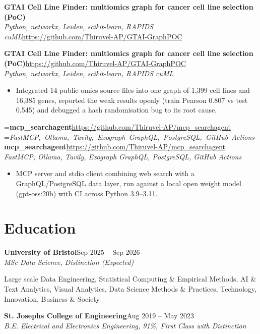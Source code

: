 \documentclass[a4paper,11pt]{article}
\newcommand{\roleNoLoc}[3]{\textbf{#1}\hfill{\color{muted}#2}\\ \textit{#3}\par}
\newcommand{\project}[3]{%
  \textbf{#1}\hfill#3\\ {\color{muted}\small\textit{#2}}\par}
\newcommand{\gap}{\vspace{5pt}}
\begin{document}
\else
\textbf{GTAI Cell Line Finder: multiomics graph for cancer cell line selection (PoC)}\\ {\color{muted}\small\textit{Python, networkx, Leiden, scikit-learn, RAPIDS cuML}}\hfill{\small\url{https://github.com/Thiruvel-AP/GTAI-GraphPOC}}\par
\fi
\else
\project{GTAI Cell Line Finder: multiomics graph for cancer cell line selection (PoC)}{Python, networkx, Leiden, scikit-learn, RAPIDS cuML}{\url{https://github.com/Thiruvel-AP/GTAI-GraphPOC}}
\fi
\begin{itemize}
  \item Integrated 14 public omics source files into one graph of 1,399 cell lines and 16,385 genes, reported the weak results openly (train Pearson 0.807 vs test 0.545) and debugged a hash randomisation bug to its root cause.
\end{itemize}
\gap
{}
=\hbox{\textbf{mcp\_searchagent}\hspace{1em}\url{https://github.com/Thiruvel-AP/mcp_searchagent}}%
=\hbox{{\small\textit{FastMCP, Ollama, Tavily, Exograph GraphQL, PostgreSQL, GitHub Actions}}}%
\ifdim\wd0>\linewidth
\ifdim\wd2>\linewidth
\textbf{mcp\_searchagent}\\ {\color{muted}\small\textit{FastMCP, Ollama, Tavily, Exograph GraphQL, PostgreSQL, GitHub Actions}}\\ \hfill{\small\url{https://github.com/Thiruvel-AP/mcp_searchagent}}\par
\else
\textbf{mcp\_searchagent}\\ {\color{muted}\small\textit{FastMCP, Ollama, Tavily, Exograph GraphQL, PostgreSQL, GitHub Actions}}\hfill{\small\url{https://github.com/Thiruvel-AP/mcp_searchagent}}\par
\fi
\else
\project{mcp\_searchagent}{FastMCP, Ollama, Tavily, Exograph GraphQL, PostgreSQL, GitHub Actions}{\url{https://github.com/Thiruvel-AP/mcp_searchagent}}
\fi
\begin{itemize}
  \item MCP server and stdio client combining web search with a GraphQL/PostgreSQL data layer, run against a local open weight model (gpt-oss:20b) with CI across Python 3.9–3.11.
\end{itemize}

\section{Education}
\roleNoLoc{University of Bristol}{Sep 2025 – Sep 2026}{MSc Data Science, Distinction \textit{(Expected)}}
{\color{muted}\small Large scale Data Engineering, Statistical Computing \& Empirical Methods, AI \& Text Analytics, Visual Analytics, Data Science Methods \& Practices, Technology, Innovation, Business \& Society}\par
\gap
{}
\roleNoLoc{St. Joseph\textquotesingle{}s College of Engineering}{Aug 2019 – May 2023}{B.E. Electrical and Electronics Engineering, 91\%, First Class with Distinction}
\end{document}
